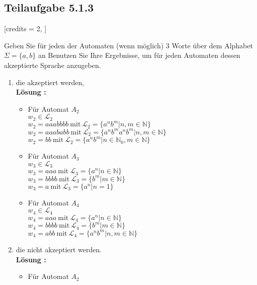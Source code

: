\documentclass[12pt]{article}
\begin{document}
  
  
  
  
  
 \subsection*{Teilaufgabe 5.1.3} 
 [credits = 2, 
 ] 
  
 Geben Sie für jeden der Automaten (wenn möglich) 3 Worte über dem Alphabet $\Sigma = \{a,b\}$ an 
  Benutzen Sie Ihre Ergebnisse, um für jeden Automaten dessen akzeptierte Sprache anzugeben. 
 \begin{enumerate} 
 \item die akzeptiert werden, \\
\textbf{ Lösung :}\\
\begin{itemize}
\item Für Automat $A_2$\\
$w_2 \in \mathcal{L}_2$\\
$w_2 = aaabbbb \ \text{mit} \ \mathcal{L}_2 = \{a^nb^m | n,m \in \mathbb{N}\}$\\
$w_2 = aaababb \ \text{mit} \ \mathcal{L}_2 = \{a^nb^ma^nb^m | n,m \in \mathbb{N}\}$\\
$w_2 = bb  \ \text{mit} \ \mathcal{L}_2 = \{a^nb^m | n \in \mathbb{N}_0,m \in \mathbb{N}\}$
\item Für Automat $A_3$\\
$w_3 \in \mathcal{L}_3$\\
$w_3 = aaa \ \text{mit} \ \mathcal{L}_3 = \{a^n | n \in \mathbb{N}\}$\\
$w_3 = bbbb \ \text{mit} \ \mathcal{L}_3 = \{b^m | m \in \mathbb{N}\}$\\
$w_3 = a  \ \text{mit} \ \mathcal{L}_3 = \{a^n | n = 1 \}$ 
\item Für Automat $A_4$\\
$w_4 \in \mathcal{L}_4$\\
$w_4 = aaa \ \text{mit} \ \mathcal{L}_4 = \{a^n | n \in \mathbb{N}\}$\\
$w_4 = bbbb \ \text{mit} \ \mathcal{L}_4 = \{b^m | m \in \mathbb{N}\}$\\
$w_4 = abb  \ \text{mit} \ \mathcal{L}_4 = \{a^nb^m | n,m \in \mathbb{N} \}$ 
\end{itemize}
 \item die nicht akzeptiert werden. \\
 \textbf{ Lösung :}\\
\begin{itemize}
\item Für Automat $A_2$\\

\end{itemize}
\end{enumerate}
\end{document}
